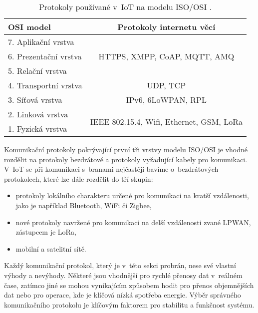 \begin{table}[h!]
    \centering
    \begin{tabular}{|l|c|}
        \hline
        \textbf{OSI model} & \textbf{Protokoly internetu věcí}                          \\ \hline
        7. Aplikační vrstva   & \multirow{3}{*}{HTTPS, XMPP, CoAP, MQTT, AMQ}              \\ %
        6. Prezentační vrstva &                                                            \\ %
        5. Relační vrstva     &                                                            \\ \hline
        4. Transportní vrstva & UDP, TCP                                                   \\ \hline
        3. Síťová vrstva      & IPv6, 6LoWPAN, RPL                                         \\ \hline
        2. Linková vrstva     & \multirow{2}{*}{IEEE 802.15.4, Wifi, Ethernet, GSM, LoRa}  \\ %
        1. Fyzická vrstva     &                                                            \\ \hline
    \end{tabular}
    \caption{Protokoly používané v~IoT na modelu ISO/OSI \cite{buyya2016internet_POV3}.}
    \label{tab:osi_layers}
\end{table}

Komunikační protokoly pokrývající první tři vrstvy modelu ISO/OSI je vhodné rozdělit na protokoly bezdrátové a protokoly vyžadující kabely pro komunikaci. V~IoT se při komunikaci s~branami nejčastěji bavíme o~bezdrátových protokolech, které lze dále rozdělit do tří skupin:

\begin{itemize}
    \item protokoly lokálního charakteru určené pro komunikaci na kratší vzdálenosti, jako je například Bluetooth, WiFi či Zigbee,
    \item nové protokoly navržené pro komunikaci na delší vzdálenosti zvané LPWAN, zástupcem je LoRa,
    \item mobilní a satelitní sítě.
\end{itemize}

Každý komunikační protokol, který je v~této sekci probrán, nese své vlastní výhody a nevýhody. Některé jsou vhodnější pro rychlé přenosy dat v~reálném čase, zatímco jiné se mohou vynikajícím způsobem hodit pro přenos objemnějších dat nebo pro operace, kde je klíčová nízká spotřeba energie. Výběr správného komunikačního protokolu je klíčovým faktorem pro stabilitu a funkčnost systému. 

